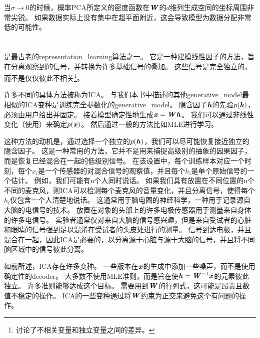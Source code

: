 当$\sigma\xrightarrow{} 0$的时候，概率PCA所定义的密度函数在$\boldsymbol{\mathit{W}}$的$d$维列生成空间的坐标周围非常尖锐。
如果数据实际上没有集中在超平面附近，这会导致模型为数据分配非常低的可能性。

\section{}
\label{sec:independent_component_analysis_ica}


是最古老的\gls{representation_learning}算法之一\citep{Herault+Ans-1984,Jutten+Herault-91,Comon94,Hyvarinen-1999,Hyvarinen-2001,Hinton-ICA-2001,Teh-2003}。
它是一种建模线性因子的方法，旨在分离观察到的信号，并转换为许多基础信号的叠加。
这些信号是完全独立的，而不是仅仅彼此不相关\footnote{讨论了不相关变量和独立变量之间的差异。}。


许多不同的具体方法被称为\gls{ICA}。
与我们本书中描述的其他\gls{generative_model}最相似的\gls{ICA}变种是训练完全参数化的\gls{generative_model}\citep{Pham-et-al-1992}。
隐含因子$\boldsymbol{\mathit{h}}$的先验$p(\boldsymbol{\mathit{h}})$，必须由用户给出并固定。
接着模型确定性地生成$\boldsymbol{\mathit{x}} = \boldsymbol{\mathit{W}} \boldsymbol{\mathit{h}}$。
我们可以通过非线性变化（使用）来确定$p(\boldsymbol{\mathit{x}})$。
然后通过一般的方法比如\gls{MLE}进行学习。


这种方法的动机是，通过选择一个独立的$p(\boldsymbol{\mathit{h}})$，我们可以尽可能恢复接近独立的隐含因子。
这是一种常用的方法，它并不是用来捕捉高级别的抽象的因果因子，而是恢复已经混合在一起的低级别信号。
在该设置中，每个训练样本对应一个时刻，每个$x_i$是一个传感器的对混合信号的观察值，并且每个$h_i$是单个原始信号的一个估计。
例如，我们可能有n个人同时说话。 
如果我们具有放置在不同位置的n个不同的麦克风，则\gls{ICA}可以检测每个麦克风的音量变化，并且分离信号，使得每个$h_i$仅包含一个人清楚地说话。
这通常用于脑电图的神经科学，一种用于记录源自大脑的电信号的技术。
放置在对象的头部上的许多电极传感器用于测量来自身体的许多电信号。
实验者通常仅对来自大脑的信号感兴趣，但是来自受试者的心脏和眼睛的信号强到足以混淆在受试者的头皮处进行的测量。
信号到达电极，并且混合在一起，因此\gls{ICA}是必要的，以分离源于心脏与源于大脑的信号，并且将不同脑区域中的信号彼此分离。


如前所述，\gls{ICA}存在许多变种。
一些版本在$\boldsymbol{\mathit{x}}$的生成中添加一些噪声，而不是使用确定性的\gls{decoder}。
大多数不使用\gls{MLE}准则，而是旨在使$\boldsymbol{\mathit{h}} = \boldsymbol{\mathit{W}}^{-1}\boldsymbol{\mathit{x}}$的元素彼此独立。
许多准则能够达成这个目标。
需要用到$\boldsymbol{\mathit{W}}$的行列式，这可能是昂贵且数值不稳定的操作。
\gls{ICA}的一些变种通过将$\boldsymbol{\mathit{W}}$约束为正交来避免这个有问题的操作。


